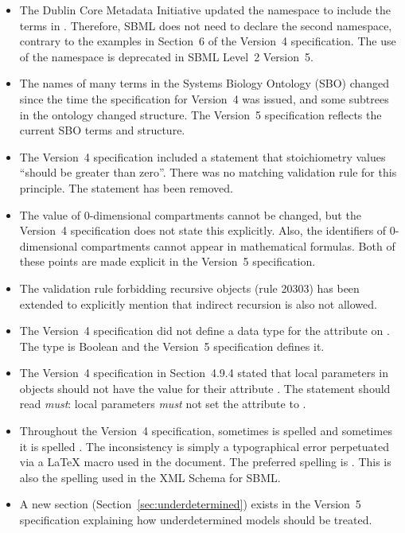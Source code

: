 \begin{itemize}
\item The Dublin Core Metadata Initiative updated the namespace
   to include the terms in
  . Therefore, SBML does not
  need to declare the second namespace, contrary to the examples
  in Section~6 of the Version~4 specification.  The use of the
   namespace is deprecated
  in SBML Level~2 Version~5.

\item The names of many terms in the Systems Biology Ontology
  (SBO) changed since the time the specification for Version~4 was
  issued, and some subtrees in the ontology changed structure.
  The Version~5 specification reflects the current SBO terms and
  structure.

\item The Version~4 specification included a statement that
  stoichiometry values ``should be greater than zero''.  There was
  no matching validation rule for this principle.  The statement
  has been removed.

\item The value of 0-dimensional compartments cannot be changed,
  but the Version~4 specification does not state this explicitly.
  Also, the identifiers of 0-dimensional compartments cannot
  appear in mathematical formulas.  Both of these points are made
  explicit in the Version~5 specification.

\item The validation rule forbidding recursive \FunctionDefinition 
  objects (rule 20303) has been extended to explicitly mention
  that indirect recursion is also not allowed.

\item The Version~4 specification did not define a data type for
  the  attribute on \Event.  The
  type is Boolean and the Version~5 specification defines it.

\item The Version~4 specification in Section~4.9.4 stated that
  local parameters in \Reaction objects should not have the value
   for their attribute .  The statement
  should read \emph{must}: local parameters \emph{must} not set
  the  attribute to .

\item Throughout the Version~4 specification, sometimes \SBase is
  spelled \textbf{} and sometimes it is spelled
  \textbf{}. The inconsistency is simply a typographical
  error perpetuated via a \LaTeX{} macro used in the document. The
  preferred spelling is \SBase. This is also the spelling used in
  the XML Schema for SBML.

\item A new section (Section~\ref{sec:underdetermined}) exists in
  the Version~5 specification explaining how underdetermined
  models should be treated.

\end{itemize}


\renewcommand{\thesubsection}{\Alph{section}.\arabic{subsection}}
